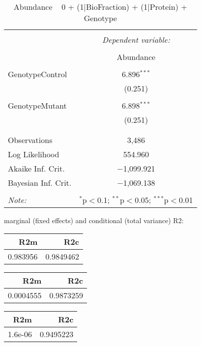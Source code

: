\documentclass[11pt]{report}
\begin{document}
\begin{table}[!htbp] \centering 
  \caption{Abundance ~ 0 + (1|BioFraction) + (1|Protein) + Genotype} 
  \label{} 
\begin{tabular}{@{\extracolsep{5pt}}lc} 
\\[-1.8ex]\hline 
\hline \\[-1.8ex] 
 & \multicolumn{1}{c}{\textit{Dependent variable:}} \\ 
\cline{2-2} 
\\[-1.8ex] & Abundance \\ 
\hline \\[-1.8ex] 
 GenotypeControl & 6.896$^{***}$ \\ 
  & (0.251) \\ 
  & \\ 
 GenotypeMutant & 6.898$^{***}$ \\ 
  & (0.251) \\ 
  & \\ 
\hline \\[-1.8ex] 
Observations & 3,486 \\ 
Log Likelihood & 554.960 \\ 
Akaike Inf. Crit. & $-$1,099.921 \\ 
Bayesian Inf. Crit. & $-$1,069.138 \\ 
\hline 
\hline \\[-1.8ex] 
\textit{Note:}  & \multicolumn{1}{r}{$^{*}$p$<$0.1; $^{**}$p$<$0.05; $^{***}$p$<$0.01} \\ 
\end{tabular} 
\end{table} 
marginal (fixed effects) and conditional (total variance) R2:

\begin{tabular}{r|r}
\hline
R2m & R2c\\
\hline
0.983956 & 0.9849462\\
\hline
\end{tabular}

\begin{tabular}{r|r}
\hline
R2m & R2c\\
\hline
0.0004555 & 0.9873259\\
\hline
\end{tabular}

\begin{tabular}{r|r}
\hline
R2m & R2c\\
\hline
1.6e-06 & 0.9495223\\
\hline
\end{tabular}
\end{document}
